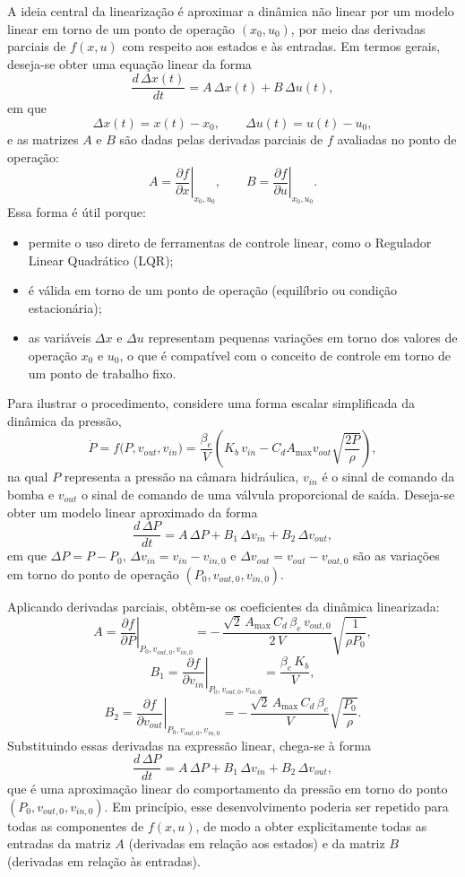 A ideia central da linearização é aproximar a dinâmica não linear por um modelo linear em torno de um ponto de operação $(x_0,u_0)$, por meio das derivadas parciais de $f(x,u)$ com respeito aos estados e às entradas. Em termos gerais, deseja-se obter uma equação linear da forma
\[
    \frac{d\,\Delta x(t)}{dt} = A\,\Delta x(t) + B\,\Delta u(t),
\]
em que
\[
    \Delta x(t) = x(t) - x_0, \qquad
    \Delta u(t) = u(t) - u_0,
\]
e as matrizes $A$ e $B$ são dadas pelas derivadas parciais de $f$ avaliadas no ponto de operação:
\[
    A = \left.\frac{\partial f}{\partial x}\right|_{x_0,u_0},
    \qquad
    B = \left.\frac{\partial f}{\partial u}\right|_{x_0,u_0}.
\]
Essa forma é útil porque:
\begin{itemize}
    \item permite o uso direto de ferramentas de controle linear, como o Regulador Linear Quadrático (LQR);
    \item é válida em torno de um ponto de operação (equilíbrio ou condição estacionária);
    \item as variáveis $\Delta x$ e $\Delta u$ representam pequenas variações em torno dos valores de operação $x_0$ e $u_0$, o que é compatível com o conceito de controle em torno de um ponto de trabalho fixo.
\end{itemize}

Para ilustrar o procedimento, considere uma forma escalar simplificada da dinâmica da pressão,
\[
    \dot{P} = f\big(P, v_{out}, v_{in}\big)
             = \frac{\beta_e}{V}\left( K_b\,v_{in}
               - C_d A_{\max} v_{out}\sqrt{\frac{2P}{\rho}} \right),
\]
na qual $P$ representa a pressão na câmara hidráulica, $v_{in}$ é o sinal de comando da bomba e $v_{out}$ o sinal de comando de uma válvula proporcional de saída. Deseja-se obter um modelo linear aproximado da forma
\[
    \frac{d\,\Delta P}{dt}
    = A\,\Delta P + B_1\,\Delta v_{in} + B_2\,\Delta v_{out},
\]
em que $\Delta P = P - P_0$, $\Delta v_{in} = v_{in} - v_{in,0}$ e $\Delta v_{out} = v_{out} - v_{out,0}$ são as variações em torno do ponto de operação $(P_0, v_{out,0}, v_{in,0})$.

Aplicando derivadas parciais, obtêm-se os coeficientes da dinâmica linearizada:
\[
    A = \left.\frac{\partial f}{\partial P}\right|_{P_0,v_{out,0},v_{in,0}}
      = -\,\frac{\sqrt{2}\,A_{\max}\,C_d\,\beta_e\,v_{out,0}}{2\,V}
         \sqrt{\frac{1}{\rho P_0}},
\]
\[
    B_1 = \left.\frac{\partial f}{\partial v_{in}}\right|_{P_0,v_{out,0},v_{in,0}}
        = \frac{\beta_e\,K_b}{V},
\]
\[
    B_2 = \left.\frac{\partial f}{\partial v_{out}}\right|_{P_0,v_{out,0},v_{in,0}}
        = -\,\frac{\sqrt{2}\,A_{\max}\,C_d\,\beta_e}{V}
            \sqrt{\frac{P_0}{\rho}}.
\]
Substituindo essas derivadas na expressão linear, chega-se à forma
\[
    \frac{d\,\Delta P}{dt}
    = A\,\Delta P + B_1\,\Delta v_{in} + B_2\,\Delta v_{out},
\]
que é uma aproximação linear do comportamento da pressão em torno do ponto $(P_0, v_{out,0}, v_{in,0})$. Em princípio, esse desenvolvimento poderia ser repetido para todas as componentes de $f(x,u)$, de modo a obter explicitamente todas as entradas da matriz $A$ (derivadas em relação aos estados) e da matriz $B$ (derivadas em relação às entradas).


